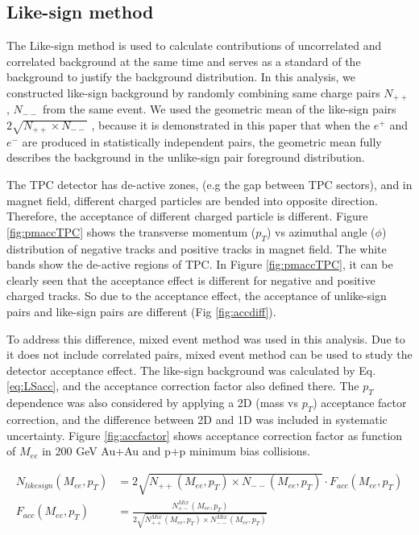 \subsection{Like-sign method}

The Like-sign method is used to calculate contributions of uncorrelated
and correlated background at the same time and serves as a standard
of the background to justify the background distribution. In this
analysis, we constructed like-sign background by randomly combining
same charge pairs $N_{++}$ , $N_{--}$ from the same event. We used
the geometric mean of the like-sign pairs $2\sqrt{N_{++}\times N_{--}}$
, because it is demonstrated in this paper \cite{PhysRevC.81.034911}
that when the $e^{+}$ and $e^{-}$ are produced in statistically
independent pairs, the geometric mean fully describes the background
in the unlike-sign pair foreground distribution.

The TPC detector has de-active zones, (e.g the gap between TPC sectors),
and in magnet field, different charged particles are bended into opposite
direction. Therefore, the acceptance of different charged particle
is different. Figure \ref{fig:pmaccTPC} shows the transverse momentum
($p_{T}$) vs azimuthal angle ($\phi$) distribution of negative tracks
and positive tracks in magnet field. The white bands show the de-active
regions of TPC. In Figure \ref{fig:pmaccTPC}, it can be clearly seen
that the acceptance effect is different for negative and positive
charged tracks. So due to the acceptance effect, the acceptance of
unlike-sign pairs and like-sign pairs are different (Fig \ref{fig:accdiff}). 

To address this difference, mixed event method was used in this analysis.
Due to it does not include correlated pairs, mixed event method can
be used to study the detector acceptance effect. The like-sign background
was calculated by Eq. \ref{eq:LSacc}, and the acceptance correction
factor also defined there. The $p_{T}$ dependence was also considered
by applying a 2D ($ $mass vs $p_{T}$) acceptance factor correction,
and the difference between 2D and 1D was included in systematic uncertainty.
Figure \ref{fig:accfactor} shows acceptance correction factor as
function of $M_{ee}$ in 200 GeV Au+Au and p+p minimum bias collisions.

\begin{align}
N_{likesign}(M_{ee},p_{T}) & =2\sqrt{N_{++}(M_{ee},p_{T})\times N_{--}(M_{ee},p_{T})}\cdot F_{acc}(M_{ee},p_{T})\nonumber \\
F_{acc}(M_{ee},p_{T}) & =\frac{N_{+-}^{Mix}(M_{ee},p_{T})}{2\sqrt{N_{++}^{Mix}(M_{ee},p_{T})\times N_{--}^{Mix}(M_{ee},p_{T})}}\label{eq:LSacc}
\end{align}



